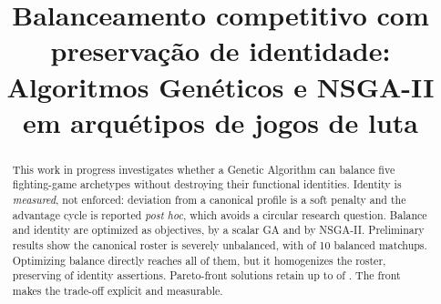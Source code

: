 \documentclass[10pt,conference]{IEEEtran}
\begin{document}
\title{Balanceamento competitivo com preservação de identidade: Algoritmos Genéticos e NSGA-II em arquétipos de jogos de luta}

\newif\iffinal
\finaltrue 

\newcommand{\cmtid}{34734}

\iffinal
\author{
\and
{}
}
\else
  \author{ID do artigo Latin.science 2026: \cmtid \\ }
\fi

\maketitle
\thispagestyle{fancy}

\renewcommand{\abstractname}{Abstract}

\begin{abstract}
This work in progress investigates whether a Genetic Algorithm can balance five
fighting-game archetypes without destroying their functional identities. Identity is
\emph{measured}, not enforced: deviation from a canonical profile is a soft penalty
and the advantage cycle is reported \emph{post hoc}, which avoids a circular
research question. Balance and identity are optimized as objectives, by a
scalar GA and by NSGA-II. Preliminary results show the canonical roster is severely
unbalanced, with \eqCan{} of 10 balanced matchups. Optimizing balance directly
reaches all \eqAg{} of them, but it homogenizes the roster, preserving \valAg{} of
\valTotal{} identity assertions. Pareto-front solutions retain up to \valKnee{} of
\valTotal{}. The front makes the trade-off explicit and measurable.
\end{abstract}
\end{document}
